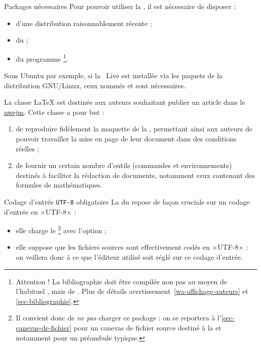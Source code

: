 \documentclass[french,nolocaltoc]{nwejmart}
\newtheorem[style=definition]{fait}
\newtheorem[title=contraventionnalisation]{ctrv}
\newtheorem[title-plural=anneaux]{anneau}
\newtheorem[title-plural=idéaux]{idéal}
\begin{document}
\begin{dbwarning}{Packages nécessaires}{}
  Pour pouvoir utiliser la \nwejmauthorcl{}, il est nécessaire de disposer :
  \begin{itemize}
  \item d'une distribution  raisonnablement récente ;
  \item du  ;
  \item du programme
    \href{https://www.ctan.org/pkg/biber}{}\footnote{Attention !
      La bibliographie doit être compilée non pas au moyen de l'habituel
      , mais de . Plus de détails
      avertissement~\ref{wa-affichage-auteurs} \pageref{wa-affichage-auteurs} et
      \vref{sec-bibliographie}.}.
  \end{itemize}
  Sous Ubuntu par exemple, si la ~Live est installée via les paquets
  de la distribution GNU/Linux, ceux nommés  et
   sont nécessaires.
\end{dbwarning}

La classe \LaTeX{} \nwejmauthor{} est destinée aux auteurs souhaitant publier un
article dans le \href{http://math.univ-lille1.fr/~nwejm/}{\gls{nwejm}}. Cette
classe a pour but :
\begin{enumerate}
\item de reproduire fidèlement la maquette de la \nwejmcl{}, permettant ainsi
  aux auteurs de pouvoir travailler la mise en page de leur document dans des
  conditions réelles ;
\item de fournir un certain nombre d'outils (commandes et environnements)
  destinés à faciliter la rédaction de documents, notamment ceux contenant des
  formules de mathématiques.
\end{enumerate}

\begin{dbwarning}{Codage d'entrée \protect\lstinline+UTF-8+ obligatoire}{}
  La \nwejmauthorcl{} du \nwejm{} repose de façon cruciale sur un codage
  d'entrée en ×UTF-8× :
  \begin{itemize}
  \item elle charge le \footnote{%
      Il convient donc de \emph{ne pas} charger ce package : on se reportera
      à l'\vref{sec-canevas-de-fichier} pour un canevas de fichier source
      destiné à la \nwejm{} et notamment pour un préambule typique.%
    }
    avec l'option  ;
  \item elle suppose que les fichiers sources  sont effectivement
    codés en ×UTF-8× : on veillera donc à ce que l'éditeur utilisé soit réglé
    sur ce codage d'entrée.
  \end{itemize}
\end{dbwarning}
\end{document}
